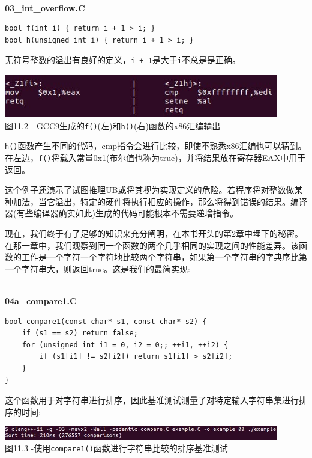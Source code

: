 \hspace*{\fill} \\ %
\noindent
\textbf{03\_int\_overflow.C}
\begin{lstlisting}[style=styleCXX]
bool f(int i) { return i + 1 > i; }
bool h(unsigned int i) { return i + 1 > i; }
\end{lstlisting}

无符号整数的溢出有良好的定义，\texttt{i + 1}是大于\texttt{i}不总是是正确。

\begin{center}
\includegraphics[width=0.9\textwidth]{content/3/chapter11/images/2.jpg}\\
图11.2 - GCC9生成的\texttt{f()}(左)和\texttt{h()}(右)函数的x86汇编输出
\end{center}

\texttt{h()}函数产生不同的代码，cmp指令会进行比较，即使不熟悉x86汇编也可以猜到。在左边，\texttt{f()}将载入常量0x1(布尔值也称为true)，并将结果放在寄存器EAX中用于返回。 

这个例子还演示了试图推理UB或将其视为实现定义的危险。若程序将对整数做某种加法，当它溢出，特定的硬件将执行相应的操作，那么将得到错误的结果。编译器(有些编译器确实如此)生成的代码可能根本不需要递增指令。

现在，我们终于有了足够的知识来充分阐明，在本书开头的第2章中埋下的秘密。在那一章中，我们观察到同一个函数的两个几乎相同的实现之间的性能差异。该函数的工作是一个字符一个字符地比较两个字符串，如果第一个字符串的字典序比第一个字符串大，则返回true。这是我们的最简实现:

\hspace*{\fill} \\ %
\noindent
\textbf{04a\_compare1.C}
\begin{lstlisting}[style=styleCXX]
bool compare1(const char* s1, const char* s2) {
	if (s1 == s2) return false;
	for (unsigned int i1 = 0, i2 = 0;; ++i1, ++i2) {
		if (s1[i1] != s2[i2]) return s1[i1] > s2[i2];
	}
}
\end{lstlisting}

这个函数用于对字符串进行排序，因此基准测试测量了对特定输入字符串集进行排序的时间:

\begin{center}
\includegraphics[width=0.9\textwidth]{content/3/chapter11/images/3.jpg}\\
图11.3 -使用\texttt{compare1()}函数进行字符串比较的排序基准测试
\end{center}

